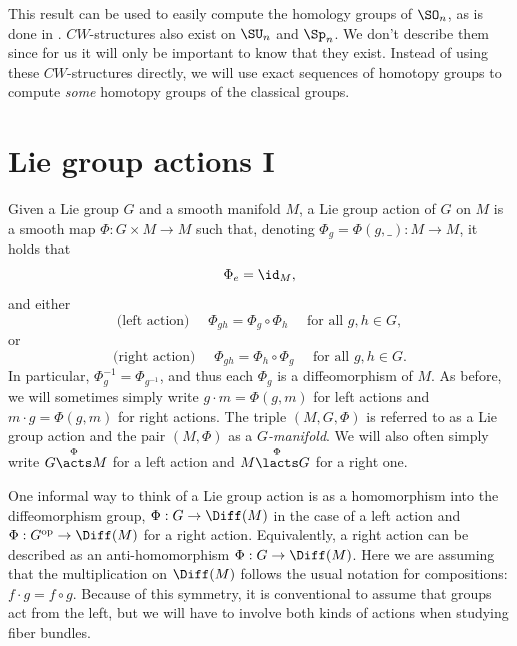 This result can be used to easily compute the homology groups of $\SO_n$, as is done in \cite{Hatcher}. $CW$-structures also exist on $\SU_n$ and $\Sp_n$. We don't describe them since for us it will only be important to know that they exist. Instead of using these $CW$-structures directly, we will use exact sequences of homotopy groups to compute \emph{some} homotopy groups of the classical groups.





\section{Lie group actions I} \label{sec: Lie group actions}

\begin{defn}
    Given a Lie group $G$ and a smooth manifold $M$, a Lie group action of $G$ on $M$ is a smooth map $\Phi:G\times M\to M$ such that, denoting $\Phi_g=\Phi(g,\_):M\to M$, it holds that \[\Phi_e=\id_M,\] and either
    \[\text{(left action) }\quad \Phi_{gh}=\Phi_g\circ \Phi_h\quad \text{ for all } g,h\in G, \]
    or
    \[\text{(right action) }\quad \Phi_{gh}=\Phi_h\circ \Phi_g\quad \text{ for all } g,h\in G.\]
    In particular, $\Phi_{g}^{-1}=\Phi_{g^{-1}}$, and thus each $\Phi_g$ is a diffeomorphism of $M$. As before, we will sometimes simply write $g\cdot m=\Phi(g,m)$ for left actions and $m\cdot g=\Phi(g,m)$ for right actions. The triple $(M,G,\Phi)$ is referred to as a Lie group action and the pair $(M,\Phi)$ as a \emph{$G$-manifold}. We will also often simply write $G\overset{\Phi}{\acts} M$ for a left action and $M\overset{\Phi}{\lacts} G$ for a right one.
\end{defn}

\begin{rem}
    One informal way to think of a Lie group action is as a homomorphism into the diffeomorphism group, $\Phi:G\to \Diff(M)$ in the case of a left action and $\Phi:G^{\mathrm{op}}\to \Diff(M)$ for a right action. Equivalently, a right action can be described as an anti-homomorphism $\Phi:G\to \Diff(M)$. Here we are assuming that the multiplication on $\Diff(M)$ follows the usual notation for compositions: $f\cdot g=f\circ g$. Because of this symmetry, it is conventional to assume that groups act from the left, but we will have to involve both kinds of actions when studying fiber bundles.
\end{rem}

